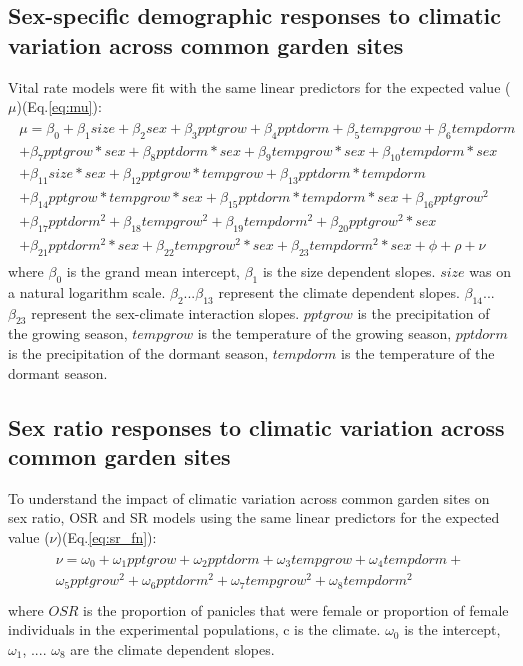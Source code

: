 \documentclass[12pt]{article}\usepackage[]{graphicx}\usepackage[dvipsnames]{xcolor}
\begin{document}
\subsection{Sex-specific demographic responses to climatic variation across common garden sites} \label {sssec:vital_rate}
Vital rate models were fit with the same linear predictors for the expected value ($\mu$)(Eq.\ref{eq:mu}):
\begin{align}\label{eq:mu}
\begin{split}
\mu = \beta_{0} + \beta_{1}size + \beta_{2}sex + \beta_{3}pptgrow + \beta_{4}pptdorm + \beta_{5}tempgrow + \beta_{6}tempdorm \\ 
+ \beta_{7}pptgrow*sex + \beta_{8}pptdorm*sex + \beta_{9}tempgrow*sex + \beta_{10}tempdorm*sex  \\ 
+  \beta_{11}size*sex + \beta_{12}pptgrow*tempgrow + \beta_{13}pptdorm*tempdorm\\
+ \beta_{14}pptgrow*tempgrow*sex + \beta_{15}pptdorm*tempdorm*sex + \beta_{16}pptgrow^2\\
+ \beta_{17}pptdorm^2 + \beta_{18}tempgrow^2 + \beta_{19}tempdorm^2 + \beta_{20}pptgrow^2*sex  \\
+ \beta_{21}pptdorm^2*sex + \beta_{22}tempgrow^2*sex + \beta_{23}tempdorm^2*sex + \phi + \rho + \nu 
\end{split}
\end{align}
\noindent where $\beta_{0}$ is the  grand mean intercept, $\beta_{1}$ is the size dependent slopes.
$size$ was on a natural logarithm scale. 
$\beta_{2}$...$\beta_{13}$ represent the climate dependent slopes.
$\beta_{14}$...$\beta_{23}$ represent the sex-climate interaction slopes.
$pptgrow$ is the precipitation of the growing season, $tempgrow$ is the temperature of the growing season, $pptdorm$ is the precipitation of the dormant season, $tempdorm$ is the temperature of the dormant season.

\subsection{Sex ratio responses to climatic variation across common garden sites} \label {sssec:sexratio_bayesian}
To understand the impact of climatic variation across common garden sites on sex ratio, OSR and SR  models using  the same linear predictors for the expected value ($\nu$)(Eq.\ref{eq:sr_fn}):
\begin{align}\label{eq:sr_fn}
\begin{split}
	\nu =   \omega_{0}+ \omega_{1}pptgrow + \omega_{2}pptdorm + \omega_{3}tempgrow + \omega_{4}tempdorm + \\
	  \omega_{5}pptgrow^2 + \omega_{6}pptdorm^2 + \omega_{7}tempgrow^2 + \omega_{8}tempdorm^2 \\
\end{split}
\end{align}
\noindent where $OSR$ is the proportion of panicles that were female or proportion of female individuals in the experimental populations, c is the climate. 
$\omega_{0}$ is the intercept, $\omega_{1}$, .... $\omega_{8}$ are the climate dependent slopes.
\end{document}
